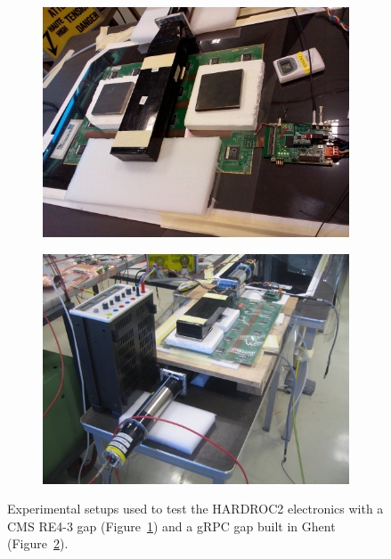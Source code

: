 	\begin{figure}[H]
		\begin{subfigure}{.5\linewidth}
		    \centering
			\includegraphics[width = \linewidth]{fig/chapt6/Setup_HARDROC_PAK.jpg}
			\caption{\label{fig:Setup-HARDROC2:A}}
		\end{subfigure}
		\begin{subfigure}{.5\linewidth}
		    \centering
			\includegraphics[width = \linewidth]{fig/chapt6/Setup_HARDROC_gRPC.JPG}
			\caption{\label{fig:Setup-HARDROC2:B}}
		\end{subfigure}
		\caption{\label{fig:Setup-HARDROC2} Experimental setups used to test the HARDROC2 electronics with a CMS RE4-3 gap (Figure~\ref{fig:Setup-HARDROC2:A}) and a gRPC gap built in Ghent (Figure~\ref{fig:Setup-HARDROC2:B}).}
    \end{figure}
	
